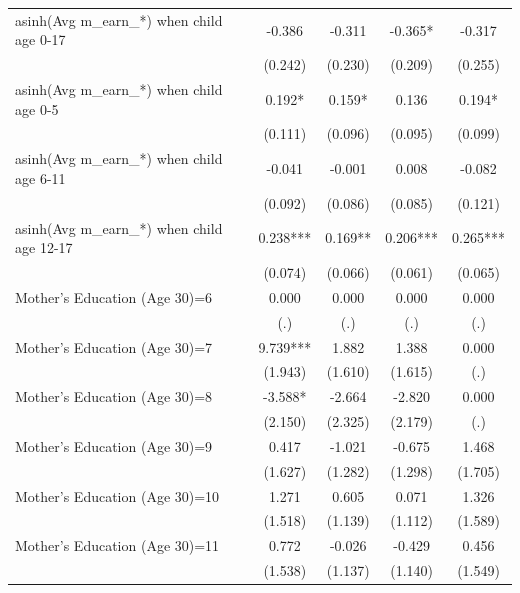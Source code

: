 \begin{table}[ht!]
{\begin{tabular}{l*{4}{c}}
asinh(Avg m\_earn\_*) when child age 0-17&      -0.386   &      -0.311   &      -0.365*  &      -0.317   \\
                    &     (0.242)   &     (0.230)   &     (0.209)   &     (0.255)   \\
asinh(Avg m\_earn\_*) when child age 0-5&       0.192*  &       0.159*  &       0.136   &       0.194*  \\
                    &     (0.111)   &     (0.096)   &     (0.095)   &     (0.099)   \\
asinh(Avg m\_earn\_*) when child age 6-11&      -0.041   &      -0.001   &       0.008   &      -0.082   \\
                    &     (0.092)   &     (0.086)   &     (0.085)   &     (0.121)   \\
asinh(Avg m\_earn\_*) when child age 12-17&       0.238***&       0.169** &       0.206***&       0.265***\\
                    &     (0.074)   &     (0.066)   &     (0.061)   &     (0.065)   \\
Mother's Education (Age 30)=6&       0.000   &       0.000   &       0.000   &       0.000   \\
                    &         (.)   &         (.)   &         (.)   &         (.)   \\
Mother's Education (Age 30)=7&       9.739***&       1.882   &       1.388   &       0.000   \\
                    &     (1.943)   &     (1.610)   &     (1.615)   &         (.)   \\
Mother's Education (Age 30)=8&      -3.588*  &      -2.664   &      -2.820   &       0.000   \\
                    &     (2.150)   &     (2.325)   &     (2.179)   &         (.)   \\
Mother's Education (Age 30)=9&       0.417   &      -1.021   &      -0.675   &       1.468   \\
                    &     (1.627)   &     (1.282)   &     (1.298)   &     (1.705)   \\
Mother's Education (Age 30)=10&       1.271   &       0.605   &       0.071   &       1.326   \\
                    &     (1.518)   &     (1.139)   &     (1.112)   &     (1.589)   \\
Mother's Education (Age 30)=11&       0.772   &      -0.026   &      -0.429   &       0.456   \\
                    &     (1.538)   &     (1.137)   &     (1.140)   &     (1.549)   \\

\end{tabular}}
\end{table}
